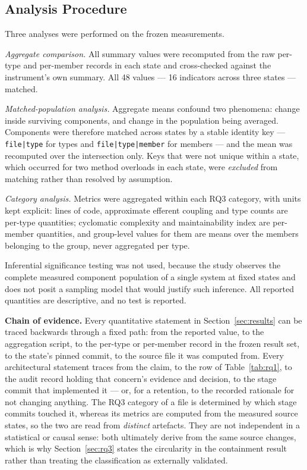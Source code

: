 \documentclass{sbc2019}%
\begin{document}
\subsection{Analysis Procedure}

Three analyses were performed on the frozen measurements.

\emph{Aggregate comparison.} All summary values were recomputed from the raw
per-type and per-member records in each state and cross-checked against the
instrument's own summary. All 48 values --- 16 indicators across three states ---
matched.

\emph{Matched-population analysis.} Aggregate means confound two phenomena:
change inside surviving components, and change in the population being averaged.
Components were therefore matched across states by a stable identity key ---
\texttt{file|type} for types and \texttt{file|type|member} for members --- and
the mean was recomputed over the intersection only. Keys that were not unique
within a state, which occurred for two method overloads in each state, were
\emph{excluded} from matching rather than resolved by assumption.

\emph{Category analysis.} Metrics were aggregated within each RQ3 category, with
units kept explicit: lines of code, approximate efferent coupling and type counts are
per-type quantities; cyclomatic complexity and maintainability index are
per-member quantities, and group-level values for them are means over the
members belonging to the group, never aggregated per type.

Inferential significance testing was not used, because the study observes the
complete measured component population of a single system at fixed states and
does not posit a sampling model that would justify such inference. All reported
quantities are descriptive, and no test is reported.

\medskip\noindent\textbf{Chain of evidence.} Every quantitative statement in
Section~\ref{sec:results} can be traced backwards through a fixed path: from the
reported value, to the aggregation script, to the per-type or per-member record
in the frozen result set, to the state's pinned commit, to the source file it was
computed from. Every architectural statement traces from the claim, to the row of
Table~\ref{tab:rq1}, to the audit record holding that concern's evidence and
decision, to the stage commit that implemented it --- or, for a retention, to the
recorded rationale for not changing anything. The RQ3 category of a file is
determined by which stage commits touched it, whereas its metrics are computed
from the measured source states, so the two are read from \emph{distinct}
artefacts. They are not independent in a statistical or causal sense: both
ultimately derive from the same source changes, which is why
Section~\ref{sec:rq3} states the circularity in the containment result rather
than treating the classification as externally validated.
\end{document}
